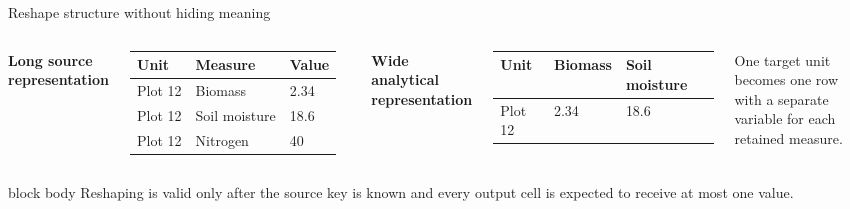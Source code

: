 \documentclass[10pt,aspectratio=169]{beamer}
\begin{document}
\begin{frame}{Reshape structure without hiding meaning}

\small

\begin{columns}[T]


\textbf{Long source representation}

\begin{tabularx}{\textwidth}{lXX}
\toprule
Unit & Measure & Value \\
\midrule
Plot 12 & Biomass & 2.34 \\
Plot 12 & Soil moisture & 18.6 \\
Plot 12 & Nitrogen & 40 \\
\bottomrule
\end{tabularx}


\textbf{Wide analytical representation}

\begin{tabularx}{\textwidth}{lXX}
\toprule
Unit & Biomass & Soil moisture \\
\midrule
Plot 12 & 2.34 & 18.6 \\
\bottomrule
\end{tabularx}

\vspace{0.20cm}

One target unit becomes one row with a separate variable for each retained measure.

\end{columns}

\vspace{0.35cm}

\begin{beamercolorbox}[rounded=true,sep=8pt]{block body}
Reshaping is valid only after the source key is known and every output cell is expected to receive at most one value.
\end{beamercolorbox}

\end{frame}
\end{document}
